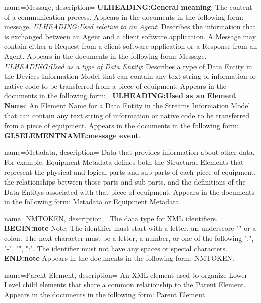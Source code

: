 {
    name={Message},
	description={
	\textbf{ULHEADING:General meaning}:
	The content of a communication process.
	Appears in the documents in the following form: message.
	\textit{ULHEADING:Used relative to an \gls{Agent}}:
	Describes the information that is exchanged between an \gls{Agent} and a client software application.  A \gls{Message} may contain either a \gls{Request} from a client software application or a \gls{Response} from an \gls{Agent}.
	Appears in the documents in the following form: \gls{Message}.
	\textit{ULHEADING:Used as a type of \gls{Data Entity}}:
	Describes a type of \gls{Data Entity} in the \gls{Devices Information Model} that can contain any text string of information or native code to be transferred from a piece of equipment.
	Appears in the documents in the following form: .
	\textbf{ULHEADING:Used as an Element Name}:
	An \gls{Element Name} for a \gls{Data Entity} in the \gls{Streams Information Model} that can contain any text string of information or native code to be transferred from a piece of equipment.
	Appears in the documents in the following form:  \textbf{GLSELEMENTNAME:message event}.
}
}

{
    name={Metadata},
	description={
	Data that provides information about other data.
	For example, \gls{Equipment Metadata} defines both the \glspl{Structural Element} that represent the physical and logical parts and sub-parts of each piece of equipment, the relationships between those parts and sub-parts, and the definitions of the \glspl{Data Entity} associated with that piece of equipment.
	Appears in the documents in the following form: \gls{Metadata} or \gls{Equipment Metadata}.
}
}

{
    name={NMTOKEN},
	description={
	The data type for XML identifiers.
	\textbf{BEGIN:note}
	Note: The identifier must start with a letter, an underscore "\textunderscore " or a colon.  The next character must be a letter, a number, or one of the following ".", "-", "\textunderscore ", ":".  The identifier must not have any spaces or special characters.
	\textbf{END:note}
	Appears in the documents in the following form: \gls{NMTOKEN}.
}
}

{
    name={Parent Element},
	description={
	An XML element used to organize \gls{Lower Level} child elements that share a common relationship to the \gls{Parent Element}.
	Appears in the documents in the following form: \gls{Parent Element}.
}
}

